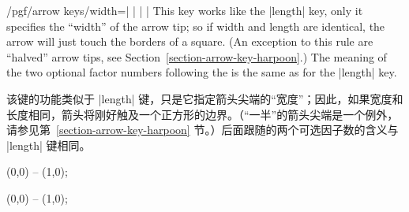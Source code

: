 \begin{key}{/pgf/arrow keys/width=| |%
        | |}
    This key works like the |length| key, only it specifies the ``width'' of
    the arrow tip; so if width and length are identical, the arrow will just
    touch the borders of a square. (An exception to this rule are ``halved''
    arrow tips, see Section~\ref{section-arrow-key-harpoon}.) The meaning of
    the two optional factor numbers following the  is the same
    as for the |length| key.
    
    该键的功能类似于 |length| 键，只是它指定箭头尖端的“宽度”；因此，如果宽度和长度相同，箭头将刚好触及一个正方形的边界。（“一半”的箭头尖端是一个例外，请参见第~\ref{section-arrow-key-harpoon} 节。）后面跟随的两个可选因子数的含义与 |length| 键相同。
\begin{codeexample}[preamble={\usetikzlibrary{arrows.meta}}]
\tikz \draw [arrows = {-Latex[width=10pt, length=10pt]}] (0,0) -- (1,0);
\end{codeexample}
\begin{codeexample}[preamble={\usetikzlibrary{arrows.meta}}]
\tikz \draw [arrows = {-Latex[width=0pt 10, length=10pt]}] (0,0) -- (1,0);
\end{codeexample}
\end{key}

